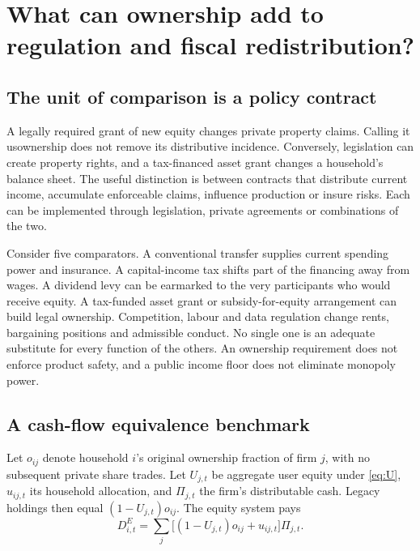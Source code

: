 \section{What can ownership add to regulation and fiscal redistribution?}
\subsection{The unit of comparison is a policy contract}
A legally required grant of new equity changes private property claims. Calling it usownership does not remove its distributive incidence. Conversely, legislation can create property rights, and a tax-financed asset grant changes a household's balance sheet. The useful distinction is between contracts that distribute current income, accumulate enforceable claims, influence production or insure risks. Each can be implemented through legislation, private agreements or combinations of the two.

Consider five comparators. A conventional transfer supplies current spending power and insurance. A capital-income tax shifts part of the financing away from wages. A dividend levy can be earmarked to the very participants who would receive equity. A tax-funded asset grant or subsidy-for-equity arrangement can build legal ownership. Competition, labour and data regulation change rents, bargaining positions and admissible conduct. No single one is an adequate substitute for every function of the others. An ownership requirement does not enforce product safety, and a public income floor does not eliminate monopoly power.

\subsection{A cash-flow equivalence benchmark}
Let $o_{ij}$ denote household $i$'s original ownership fraction of firm $j$, with no subsequent private share trades. Let $U_{j,t}$ be aggregate user equity under \eqref{eq:U}, $u_{ij,t}$ its household allocation, and $\Pi_{j,t}$ the firm's distributable cash. Legacy holdings then equal $(1-U_{j,t})o_{ij}$. The equity system pays
\begin{equation}
D^E_{i,t}=\sum_j\big[(1-U_{j,t})o_{ij}+u_{ij,t}\big]\Pi_{j,t}.\label{eq:equitypayout}
\end{equation}

